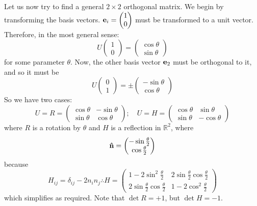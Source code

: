 Let us now try to find a general \(2 \times 2\) orthogonal matrix.
We begin by transforming the basis vectors.
\(\vb e_i = \begin{pmatrix} 1 \\ 0 \end{pmatrix}\) must be transformed to a unit vector.
Therefore, in the most general sense:
\[
	U \begin{pmatrix}
		1 \\ 0
	\end{pmatrix} = \begin{pmatrix}
		\cos \theta \\ \sin \theta
	\end{pmatrix}
\]
for some parameter \(\theta\).
Now, the other basis vector \(\vb e_2\) must be orthogonal to it, and so it must be
\[
	U \begin{pmatrix}
		0 \\ 1
	\end{pmatrix} = \pm\begin{pmatrix}
		-\sin \theta \\
		\cos \theta
	\end{pmatrix}
\]
So we have two cases:
\[
	U = R = \begin{pmatrix}
		\cos \theta & -\sin\theta \\ \sin \theta & \cos \theta
	\end{pmatrix};\quad U = H = \begin{pmatrix}
		\cos \theta & \sin \theta \\ \sin \theta & -\cos \theta
	\end{pmatrix}
\]
where \(R\) is a rotation by \(\theta\) and \(H\) is a reflection in \(\mathbb R^2\), where
\[
	\vu{n} = \begin{pmatrix}
		-\sin \frac{\theta}{2} \\ \cos \frac{\theta}{2}
	\end{pmatrix}
\]
because
\[
	H_{ij} = \delta_{ij} - 2n_i n_j \therefore H = \begin{pmatrix}
		1 - 2 \sin^2 \frac{\theta}{2}              & 2\sin\frac{\theta}{2}\cos\frac{\theta}{2} \\
		2\sin\frac{\theta}{2} \cos\frac{\theta}{2} & 1-2\cos^2\frac{\theta}{2}
	\end{pmatrix}
\]
which simplifies as required.
Note that \(\det R = +1\), but \(\det H = -1\).

